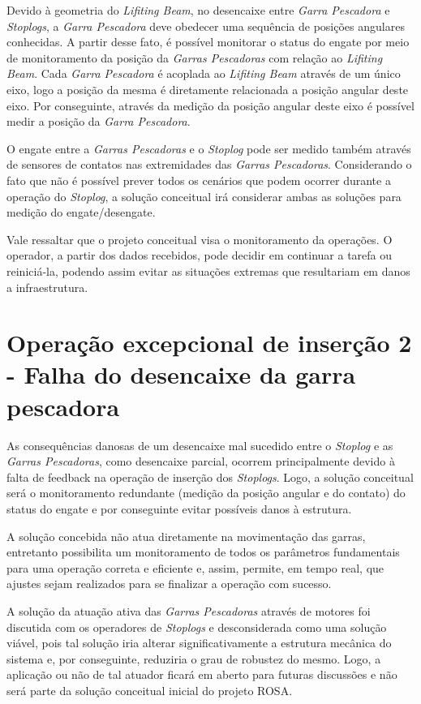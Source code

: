 Devido à geometria do \emph{Lifiting Beam}, no
desencaixe entre \emph{Garra Pescadora} e \emph{Stoplogs}, a \emph{Garra
Pescadora} deve obedecer uma sequência de posições angulares conhecidas. A
partir desse fato, é possível monitorar o status do engate por meio de monitoramento da posição da \emph{Garras Pescadoras} com relação ao \emph{Lifiting Beam}.
Cada \emph{Garra Pescadora} é acoplada ao \emph{Lifiting Beam} através de um único eixo, logo a posição da mesma é diretamente relacionada a posição angular deste eixo. Por conseguinte, através da medição da posição angular deste eixo é possível medir a posição da \emph{Garra Pescadora}. 

O engate entre a \emph{Garras Pescadoras} e o \emph{Stoplog} pode ser medido
também através de sensores de contatos nas extremidades das \emph{Garras Pescadoras}.
Considerando o fato que não é possível prever todos os cenários que podem
ocorrer durante a operação do \emph{Stoplog}, a solução conceitual irá considerar ambas
as soluções para medição do engate/desengate.

Vale ressaltar que o projeto conceitual visa o monitoramento da operações. O
operador, a partir dos dados recebidos, pode decidir em continuar a tarefa ou
reiniciá-la, podendo assim evitar as situações extremas que resultariam em danos a infraestrutura. 


\section{Operação excepcional de inserção 2 - Falha do desencaixe da garra pescadora}
\label{op:sol:ins:1}

As consequências danosas de um desencaixe mal sucedido entre o \emph{Stoplog} e
as \emph{Garras Pescadoras}, como desencaixe parcial, ocorrem
principalmente devido à falta de feedback na operação de inserção dos \emph{Stoplogs}.
Logo, a solução conceitual será o monitoramento redundante (medição da posição
angular e do contato) do status do engate e por conseguinte evitar possíveis danos à estrutura.

A solução concebida não atua diretamente na movimentação das garras, entretanto
possibilita um monitoramento de todos os parâmetros fundamentais para uma operação correta e eficiente e, assim, permite, em tempo real, que ajustes sejam realizados para se finalizar a
operação com sucesso. 

A solução da atuação ativa das \emph{Garras Pescadoras} através de motores foi
discutida com os operadores de \emph{Stoplogs} e desconsiderada como uma solução
viável, pois tal solução iria alterar significativamente a estrutura mecânica do sistema e, por conseguinte, reduziria o grau de robustez do mesmo. Logo, a aplicação ou não de tal atuador ficará em aberto para futuras discussões e não será parte da solução conceitual inicial do projeto ROSA.

